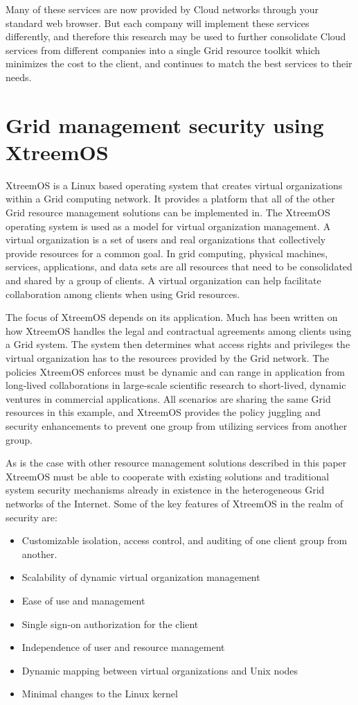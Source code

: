 \documentclass[conference]{IEEEtran}
\begin{document}
Many of these services are now provided by Cloud networks through your standard web browser. But each company will implement these services differently, and therefore this research may be used to further consolidate Cloud services from different companies into a single Grid resource toolkit which minimizes the cost to the client, and continues to match the best services to their needs. 

\section{\textbf{Grid management security using XtreemOS}}
XtreemOS is a Linux based operating system that creates virtual organizations within a Grid computing network. It provides a platform that all of the other Grid resource management solutions can be implemented in. The XtreemOS operating system is used as a model for virtual organization management. A virtual organization is a set of users and real organizations that collectively provide resources for a common goal. In grid computing, physical machines, services, applications, and data sets are all resources that need to be consolidated and shared by a group of clients. A virtual organization can help facilitate collaboration among clients when using Grid resources. \cite{xtreemos} 

The focus of XtreemOS depends on its application. Much has been written on how XtreemOS handles the legal and contractual agreements among clients using a Grid system. The system then determines what access rights and privileges the virtual organization has to the resources provided by the Grid network. The policies XtreemOS enforces must be dynamic and can range in application from long-lived collaborations in large-scale scientific research to short-lived, dynamic ventures in commercial applications. All scenarios are sharing the same Grid resources in this example, and XtreemOS provides the policy juggling and security enhancements to prevent one group from utilizing services from another group. 

As is the case with other resource management solutions described in this paper XtreemOS must be able to cooperate with existing solutions and traditional system security mechanisms already in existence in the heterogeneous Grid networks of the Internet. Some of the key features of XtreemOS in the realm of security are:

\begin{itemize}
\item Customizable isolation, access control, and auditing of one client group from another. 
\item Scalability of dynamic virtual organization management
\item Ease of use and management
\item Single sign-on authorization for the client
\item Independence of user and resource management
\item Dynamic mapping between virtual organizations and Unix nodes
\item Minimal changes to the Linux kernel
\end{itemize}
\end{document}
